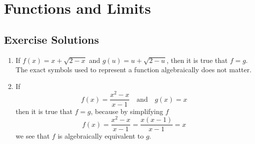 \documentclass[10pt]{article}
\begin{document}
\section{Functions and Limits}
\subsection{Exercise Solutions}

\begin{enumerate}

    \item If \( f(x) = x + \sqrt{2 - x} \) and \( g(u) = u + \sqrt{2 - u} \), then it is true that \( f = g \). The exact symbols used to represent a function algebraically does not matter.

    \item If
          \[ f(x) = \frac{x^2 - x}{x - 1} \quad \text{and} \quad g(x) = x \]
          then it is true that \( f = g \), because by simplifying \( f \)
          \[ f(x) = \frac{x^2 - x}{x - 1} = \frac{x(x - 1)}{x - 1} = x \]
          we see that \( f \) is algebraically equivalent to \(g\).

\end{enumerate}
\end{document}
